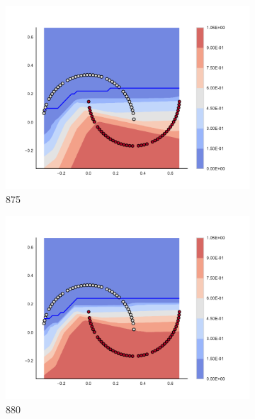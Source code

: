 \begin{figure}[h]
\begin{subfigure}[b]{0.09\textwidth}
    \includegraphics[clip, trim=2.35cm 1.75cm 4.5cm 0cm,width=\textwidth]{img/convergence/875.pdf}
    \caption{875}
    \label{fig:convergence_875}
\end{subfigure}
%
\begin{subfigure}[b]{0.09\textwidth}
    \includegraphics[clip, trim=2.35cm 1.75cm 4.5cm 0cm,width=\textwidth]{img/convergence/880.pdf}
    \caption{880}
    \label{fig:convergence_880}
\end{subfigure}
%
\begin{subfigure}[b]{0.09\textwidth}

\end{subfigure}
\end{figure}
